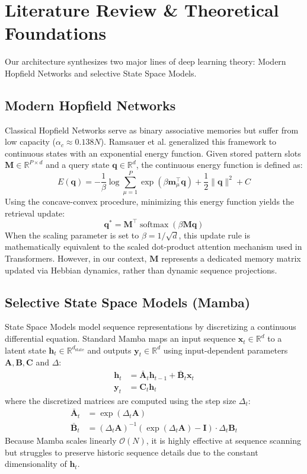 \documentclass[journal,10pt]{IEEEtran}
\newcommand{\R}{\mathbb{R}}
\newcommand{\softmax}{\operatorname{softmax}}
\begin{document}
\section{Literature Review \& Theoretical Foundations}
\label{sec:literature}

Our architecture synthesizes two major lines of deep learning theory: Modern Hopfield Networks and selective State Space Models.

\subsection{Modern Hopfield Networks}
Classical Hopfield Networks serve as binary associative memories but suffer from low capacity ($\alpha_c \approx 0.138N$). Ramsauer et al. generalized this framework to continuous states with an exponential energy function. Given stored pattern slots $\bm{M} \in \R^{P \times d}$ and a query state $\bm{q} \in \R^d$, the continuous energy function is defined as:
\begin{equation}
    E(\bm{q}) = -\frac{1}{\beta} \log \sum_{\mu=1}^P \exp(\beta \bm{m}_\mu^\top \bm{q}) + \frac{1}{2} \|\bm{q}\|^2 + C
\end{equation}
Using the concave-convex procedure, minimizing this energy function yields the retrieval update:
\begin{equation}
    \bm{q}^* = \bm{M}^\top \softmax(\beta \bm{M} \bm{q})
    \label{eq:mhn_retrieval}
\end{equation}
When the scaling parameter is set to $\beta = 1/\sqrt{d}$, this update rule is mathematically equivalent to the scaled dot-product attention mechanism used in Transformers. However, in our context, $\bm{M}$ represents a dedicated memory matrix updated via Hebbian dynamics, rather than dynamic sequence projections.

\subsection{Selective State Space Models (Mamba)}
State Space Models model sequence representations by discretizing a continuous differential equation. Standard Mamba maps an input sequence $\bm{x}_t \in \R^d$ to a latent state $\bm{h}_t \in \R^{d_{\text{state}}}$ and outputs $\bm{y}_t \in \R^d$ using input-dependent parameters $\bm{A}, \bm{B}, \bm{C}$ and $\Delta$:
\begin{align}
    \bm{h}_t &= \bar{\bm{A}}_t \bm{h}_{t-1} + \bar{\bm{B}}_t \bm{x}_t \\
    \bm{y}_t &= \bm{C}_t \bm{h}_t
\end{align}
where the discretized matrices are computed using the step size $\Delta_t$:
\begin{align}
    \bar{\bm{A}}_t &= \exp(\Delta_t \bm{A}) \\
    \bar{\bm{B}}_t &= (\Delta_t \bm{A})^{-1}(\exp(\Delta_t \bm{A}) - \bm{I}) \cdot \Delta_t \bm{B}_t
\end{align}
Because Mamba scales linearly $\mathcal{O}(N)$, it is highly effective at sequence scanning but struggles to preserve historic sequence details due to the constant dimensionality of $\bm{h}_t$.
\end{document}
